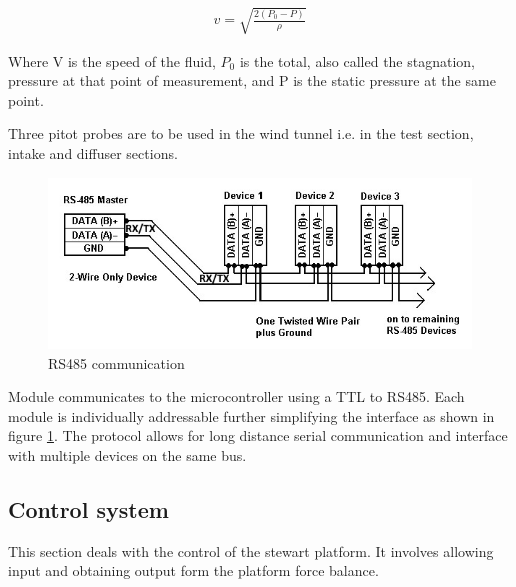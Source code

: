 \begin{ceqn}
	\begin{align}
	v = \sqrt{\frac{2(P_{0} - P)}{\rho}}
\end{align}
\end{ceqn}

Where V is the speed of the fluid, $P_{0}$ is the total, also called the stagnation, pressure at that point of measurement, and P is the static pressure at the same point.

Three pitot probes are to be used in the wind tunnel i.e. in the test section, intake and diffuser sections.
                                                                                                                                                                   
\begin{center}
\begin{figure}[H]
\centering
\includegraphics{Figures/modbus}
\caption[RS485 communication]{RS485 communication}
\label{fig:rs485}
\end{figure}
\end{center}
Module communicates to the microcontroller using a TTL to RS485. Each module is individually addressable further simplifying the interface as shown in figure \ref{fig:rs485}. 
The protocol allows for long distance serial communication and interface with multiple devices on the same bus.

\subsection{Control system}
This section deals with the control of the stewart platform. It involves allowing input and obtaining output form the platform force balance.
